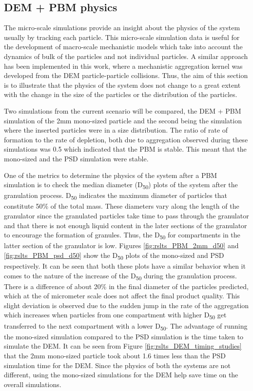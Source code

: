 \documentclass[preprint,11pt,authoryear]{elsarticle}
\begin{document}
\subsection{DEM + PBM physics}
The micro-scale simulations provide an insight about the physics of the system usually by tracking 
each particle. This micro-scale simulation data is useful for the development of macro-scale 
mechanistic models which take into account the dynamics of bulk of the particles and not individual 
particles. A similar approach has been implemented in this work, where a mechanistic aggregation 
kernel was developed from the DEM particle-particle collisions. Thus, the aim of this section is to 
illustrate that the physics of the system does not change to a great extent with the change in the size 
of the particles or the distribution of the particles.

Two simulations from the current scenario will be compared, the DEM + PBM simulation of the 2mm 
mono-sized particle and the second being the simulation where the inserted particles were in a size 
distribution. The ratio of rate of formation to the rate of depletion, both due to aggregation 
observed during these simulations was 0.5 which indicated that the PBM is stable. This meant that the
mono-sized and the PSD simulation were stable.

One of the metrics to determine the physics of the system after a PBM simulation is to check the 
median diameter (D\textsubscript{50}) plots of the system after the granulation process. 
D\textsubscript{50} indicates the maximum diameter of particles that constitute 50\% of the total mass. 
These diameters vary along the length of the granulator since the granulated particles take time to 
pass through the granulator and that there is not enough liquid content in the later sections of 
the granulator to encourage the formation of granules. Thus, the D\textsubscript{50} for compartments 
in the latter section of the granulator is low. Figures \ref{fig:rslts_PBM_2mm_d50} and 
\ref{fig:rslts_PBM_psd_d50} show the D\textsubscript{50} plots of the mono-sized and PSD respectively. 
It can be seen that both these plots have a similar behavior when it comes to the nature of the 
increase of the D\textsubscript{50} during the granulation process. There is a difference of about 
20\% in the final diameter of the particles predicted, which at the of micrometer scale does not affect 
the final product quality. This slight deviation is observed due to the sudden jump in the 
rate of the aggregation which increases when particles from one compartment with higher 
D\textsubscript{50} get transferred to the next compartment with a lower D\textsubscript{50}. 
The advantage of running the mono-sized simulation compared to the PSD simulation is the 
time taken to simulate the DEM. It can be seen from Figure \ref{fig:rslts_DEM_timing_studies} that 
the 2mm mono-sized particle took about 1.6 times less than the PSD simulation time for the DEM. 
Since the physics of both the systems are not different, using the mono-sized simulations 
for the DEM help save time on the overall simulations. 
\end{document}
